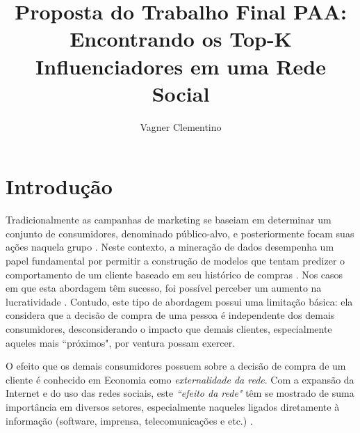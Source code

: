 \documentclass[12pt]{article}
\title{Proposta do Trabalho Final PAA:\\ 
	   Encontrando os Top-K Influenciadores em uma Rede Social}
\author{Vagner Clementino\inst{1}}
\begin{document}
 

\maketitle

     


\section{Introdução}
\label{sec:contexto}
Tradicionalmente as campanhas de marketing se baseiam em determinar um conjunto de consumidores, denominado público-alvo, e posteriormente focam suas ações naquela grupo \cite{hughes1996complete}{}. Neste contexto, a mineração de dados desempenha um papel fundamental por permitir a construção de modelos que tentam predizer o comportamento de um cliente baseado em seu histórico de compras \cite{kumar1999extracting}. Nos casos em que esta abordagem têm sucesso, foi possível perceber um aumento na lucratividade \cite{piatetsky1999estimating}. Contudo, este tipo de abordagem possui uma limitação básica: ela considera que a decisão de compra de uma pessoa é independente dos demais consumidores, desconsiderando o impacto que demais clientes, especialmente aqueles mais ``próximos", por ventura possam exercer.

O efeito que os demais consumidores possuem sobre a decisão de compra de um cliente é conhecido em Economia como \textit{externalidade da rede}{}. Com a expansão da Internet e do uso das redes sociais, este \textit{``efeito da rede"} têm se mostrado de suma importância em diversos setores, especialmente naqueles ligados diretamente à informação (software, imprensa, telecomunicações e etc.) \cite{shapiro2013information}{}.
\end{document}
